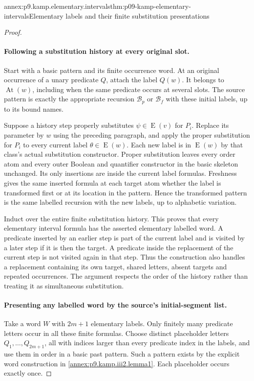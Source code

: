 \begin{annexitem}{annex:p9.kamp.elementary.intervals}{thm:p09-kamp-elementary-intervals}{Elementary labels and their finite substitution presentations}
\begin{proof}
\paragraph{Following a substitution history at every original slot.}
Start with a basic pattern and its finite occurrence word. At an original
occurrence of a unary predicate \(Q\), attach the label \(Q(w)\).
It belongs to \(\operatorname{At}(w)\), including when the same
predicate occurs at several slots. The source pattern is exactly the
appropriate recursion \(\mathcal B_p\) or \(\mathcal B_f\) with
these initial labels, up to its bound names.

Suppose a history step properly substitutes \(\psi\in
\operatorname{E}(v)\) for \(P_i\). Replace its parameter by \(w\)
using the preceding paragraph, and apply the proper substitution for
\(P_i\) to every current label \(\theta\in\operatorname{E}(w)\).
Each new label is in \(\operatorname{E}(w)\) by that class's actual
substitution constructor. Proper substitution leaves every order atom
and every outer Boolean and quantifier constructor in the basic skeleton
unchanged. Its only insertions are inside the current label formulas.
Freshness gives the same inserted formula at each target atom whether
the label is transformed first or at its location in the pattern.
Hence the transformed pattern is the same labelled recursion with the
new labels, up to alphabetic variation.

Induct over the entire finite substitution history. This proves that
every elementary interval formula has the asserted elementary labelled
word. A predicate inserted by an earlier step is part of the current
label and is visited by a later step if it is then the target. A
predicate inside the replacement of the current step is not visited
again in that step. Thus the construction also handles a replacement
containing its own target, shared letters, absent targets and repeated
occurrences. The argument respects the order of the history rather than
treating it as simultaneous substitution.

\paragraph{Presenting any labelled word by the source's initial-segment list.}
Take a word \(W\) with \(2m+1\) elementary labels. Only finitely many
predicate letters occur in all these finite formulas. Choose distinct
placeholder letters \(Q_1,\ldots,Q_{2m+1}\), all with indices larger
than every predicate index in the labels, and use them in order in a
basic past pattern. Such a pattern exists by the explicit word
construction in \cref{annex:p9.kamp.iii2.lemma1}. Each placeholder
occurs exactly once.


\end{proof}
\end{annexitem}

